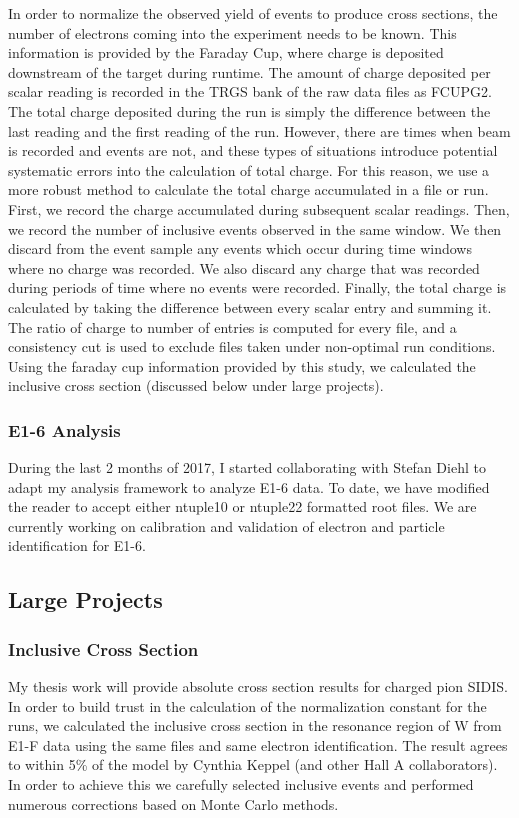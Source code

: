 In order to normalize the observed yield of events to produce cross sections, the number of electrons coming into the experiment needs to be known.  This information is provided by the Faraday Cup, where charge is deposited downstream of the target during runtime.  The amount of charge deposited per scalar reading is recorded in the TRGS bank of the raw data files as FCUPG2.  The total charge deposited during the run is simply the difference between the last reading and the first reading of the run.  However, there are times when beam is recorded and events are not, and these types of situations introduce potential systematic errors into the calculation of total charge.  For this reason, we use a more robust method to calculate the total charge accumulated in a file or run.  First, we record the charge accumulated during subsequent scalar readings.  Then, we record the number of inclusive events observed in the same window.  We then discard from the event sample any events which occur during time windows where no charge was recorded.  We also discard any charge that was recorded during periods of time where no events were recorded.  Finally, the total charge is calculated by taking the difference between every scalar entry and summing it.  The ratio of charge to number of entries is computed for every file, and a consistency cut is used to exclude files taken under non-optimal run conditions.  Using the faraday cup information provided by this study, we calculated the inclusive cross section (discussed below under large projects). 

\subsubsection{E1-6 Analysis}
During the last 2 months of 2017, I started collaborating with Stefan Diehl to adapt my analysis framework to analyze E1-6 data.  To date, we have modified the reader to accept either ntuple10 or ntuple22 formatted root files.  We are currently working on calibration and validation of electron and particle identification for E1-6.   

\subsection{Large Projects}
\subsubsection{Inclusive Cross Section}
My thesis work will provide absolute cross section results for charged pion SIDIS.  In order to build trust in the calculation of the normalization constant for the runs, we calculated the inclusive cross section in the resonance region of W from E1-F data using the same files and same electron identification.  The result agrees to within 5\% of the model by Cynthia Keppel (and other Hall A collaborators).  In order to achieve this we carefully selected inclusive events and performed numerous corrections based on Monte Carlo methods.  \\

